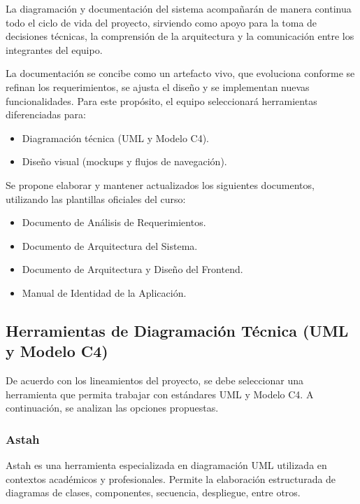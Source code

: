 \documentclass[12pt]{article}
\begin{document}
La diagramación y documentación del sistema acompañarán de manera continua todo el ciclo de vida del proyecto, sirviendo como apoyo para la toma de decisiones técnicas, la comprensión de la arquitectura y la comunicación entre los integrantes del equipo.

La documentación se concibe como un artefacto vivo, que evoluciona conforme se refinan los requerimientos, se ajusta el diseño y se implementan nuevas funcionalidades. Para este propósito, el equipo seleccionará herramientas diferenciadas para:

\begin{itemize}
    \item Diagramación técnica (UML y Modelo C4).
    \item Diseño visual (mockups y flujos de navegación).
\end{itemize}

Se propone elaborar y mantener actualizados los siguientes documentos, utilizando las plantillas oficiales del curso:

\begin{itemize}
    \item Documento de Análisis de Requerimientos.
    \item Documento de Arquitectura del Sistema.
    \item Documento de Arquitectura y Diseño del Frontend.
    \item Manual de Identidad de la Aplicación.
\end{itemize}

\subsection{Herramientas de Diagramación Técnica (UML y Modelo C4)}

De acuerdo con los lineamientos del proyecto, se debe seleccionar una herramienta que permita trabajar con estándares UML y Modelo C4. A continuación, se analizan las opciones propuestas.

\subsubsection{Astah}

Astah es una herramienta especializada en diagramación UML utilizada en contextos académicos y profesionales. Permite la elaboración estructurada de diagramas de clases, componentes, secuencia, despliegue, entre otros.
\end{document}
